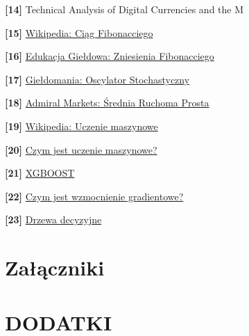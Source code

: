 \documentclass[12pt,a4paper,twoside, inzynierska]{pwr_wmat_praca_dyplomowa}
\theoremstyle{plain}
\numberwithin{theorem}{chapter}
\theoremstyle{definition}
\numberwithin{theorem}{chapter}
\begin{document}
\noindent \textbf{[14]} Technical Analysis of Digital Currencies and the M \newline

\noindent \textbf{[15]} \href{https://pl.wikipedia.org/wiki/Ci%C4%85g_Fibonacciego}{Wikipedia: Ciąg Fibonacciego} \newline

\noindent \textbf{[16]} \href{https://edukacjagieldowa.pl/gieldowe-abc/samouczki/zniesienia-fibonacciego}{Edukacja Giełdowa: Zniesienia Fibonacciego} \newline

\noindent \textbf{[17]} \href{https://gieldomania.pl/oscylator-stochastyczny-interpretacja/}{Giełdomania: Oscylator Stochastyczny} \newline

\noindent \textbf{[18]} \href{https://admiralmarkets.com/pl/education/articles/forex-indicators/srednia-ruchoma-prosta}{Admiral Markets: Średnia Ruchoma Prosta} \newline

\noindent \textbf{[19]} \href{https://pl.wikipedia.org/wiki/Uczenie_maszynowe}{Wikipedia: Uczenie maszynowe}\newline

\noindent \textbf{[20]} \href{https://www.sap.com/poland/products/artificial-intelligence/what-is-machine-learning.html}{Czym jest uczenie maszynowe?}\newline

\noindent \textbf{[21]} \href{https://www.nvidia.com/en-us/glossary/xgboost/}{XGBOOST}\newline

\noindent \textbf{[22]} \href{https://miroslawmamczur.pl/czym-jest-wzmocnienie-gradientowe-gradient-boosting-i-dlaczego-jest-taki-dobry/}{Czym jest wzmocnienie gradientowe?}\newline

\noindent \textbf{[23]} \href{https://pl.wikipedia.org/wiki/Drzewo_decyzyjne}{Drzewa decyzyjne}\newline
	\chapter{Załączniki}
	\chapter{DODATKI} 
\end{document}
